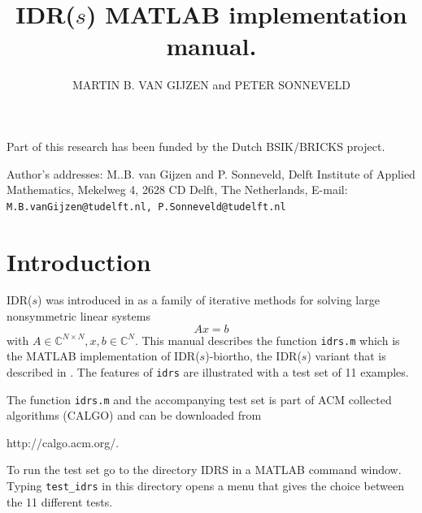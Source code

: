 \documentclass[prodmode,acmtoms]{acmsmall}
\begin{document}
\title{IDR($s$) MATLAB implementation manual.}

\author{MARTIN B. VAN GIJZEN and PETER SONNEVELD
}
\maketitle





\begin{bottomstuff}
Part of this research has been funded by the Dutch BSIK/BRICKS project.

Author's addresses: M..B. van Gijzen {and} P. Sonneveld,
Delft Institute of Applied Mathematics, Mekelweg 4, 2628 CD Delft, The Netherlands,
E-mail: {\tt M.B.vanGijzen@tudelft.nl, P.Sonneveld@tudelft.nl}
\end{bottomstuff}


\newcommand{\C}{\mathbb{C}}

\section{Introduction}
IDR($s$) was introduced in \cite{idrs} as a family of iterative methods for solving large nonsymmetric linear
systems 
\[
         Ax = b
\]
with $A \in \C^{N \times N}, x, b \in \C^{N}$. This manual describes the function {\tt idrs.m} which is the MATLAB 
implementation of IDR($s$)-biortho, the IDR($s$) variant that is described in \cite{idrs_biortho}. The features 
of {\tt idrs} are illustrated with a test set of 11 examples.

The function {\tt idrs.m} and the accompanying test set is part of ACM collected algorithms (CALGO) and can be downloaded from 

\centerline{http://calgo.acm.org/.}

To run the test set go to the directory IDRS in a MATLAB command window. Typing
{\tt test\_idrs} in this directory opens a menu that gives the choice between the 11 different tests.
\end{document}
